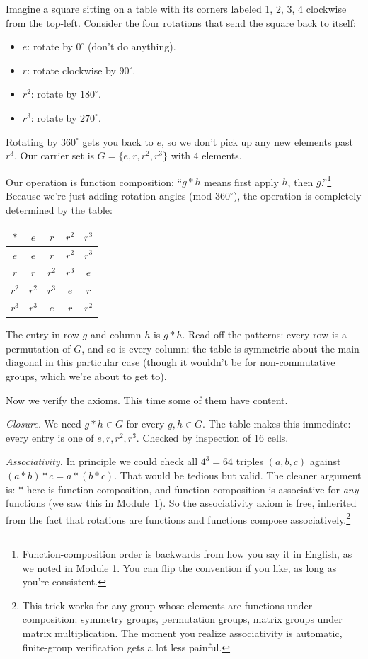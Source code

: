 \documentclass[11pt]{article}
\begin{document}
Imagine a square sitting on a table with its corners labeled 1, 2, 3, 4 clockwise from the top-left. Consider the four rotations that send the square back to itself:
\begin{itemize}
  \item $e$: rotate by $0^\circ$ (don't do anything).
  \item $r$: rotate clockwise by $90^\circ$.
  \item $r^2$: rotate by $180^\circ$.
  \item $r^3$: rotate by $270^\circ$.
\end{itemize}
Rotating by $360^\circ$ gets you back to $e$, so we don't pick up any new elements past $r^3$. Our carrier set is $G = \{e, r, r^2, r^3\}$ with $4$ elements.

Our operation is function composition: ``$g * h$ means first apply $h$, then $g$.''\footnote{Function-composition order is backwards from how you say it in English, as we noted in Module 1. You can flip the convention if you like, as long as you're consistent.} Because we're just adding rotation angles (mod $360^\circ$), the operation is completely determined by the table:

\begin{center}
\begin{tabular}{c|cccc}
$*$ & $e$ & $r$ & $r^2$ & $r^3$ \\
\hline
$e$    & $e$    & $r$    & $r^2$ & $r^3$ \\
$r$    & $r$    & $r^2$ & $r^3$ & $e$ \\
$r^2$ & $r^2$ & $r^3$ & $e$    & $r$ \\
$r^3$ & $r^3$ & $e$    & $r$    & $r^2$
\end{tabular}
\end{center}

The entry in row $g$ and column $h$ is $g * h$. Read off the patterns: every row is a permutation of $G$, and so is every column; the table is symmetric about the main diagonal in this particular case (though it wouldn't be for non-commutative groups, which we're about to get to).

Now we verify the axioms. This time some of them have content.

\emph{Closure.} We need $g * h \in G$ for every $g, h \in G$. The table makes this immediate: every entry is one of $e, r, r^2, r^3$. Checked by inspection of 16 cells.

\emph{Associativity.} In principle we could check all $4^3 = 64$ triples $(a, b, c)$ against $(a * b) * c = a * (b * c)$. That would be tedious but valid. The cleaner argument is: $*$ here is function composition, and function composition is associative for \emph{any} functions (we saw this in Module~1). So the associativity axiom is free, inherited from the fact that rotations are functions and functions compose associatively.\footnote{This trick works for any group whose elements are functions under composition: symmetry groups, permutation groups, matrix groups under matrix multiplication. The moment you realize associativity is automatic, finite-group verification gets a lot less painful.}
\end{document}

